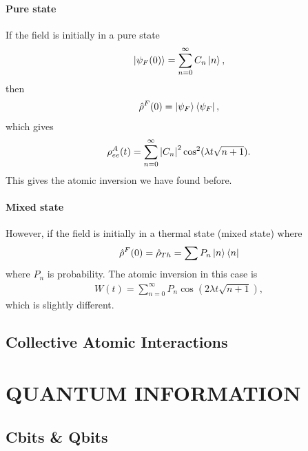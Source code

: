 \documentclass{book}
\theoremstyle{definition}
\begin{document}
\subsubsection{Pure state}
If the field is initially in a pure state
\begin{align}
\ket{\psi_F(0)} = \sum^\infty_{n=0}C_n\ket{n},
\end{align}
then
\begin{align}
\hat{\rho}^F(0) = \ket{\psi_F}\bra{\psi_F},
\end{align}
which gives
\begin{align}
\rho^A_{ee}(t) = \sum^\infty_{n=0}\abs{C_n}^2\cos^2(\lambda t \sqrt{n+1}).
\end{align}
This gives the atomic inversion we have found before. 
\subsubsection{Mixed state}
However, if the field is initially in a thermal state (mixed state) where
\begin{align}
\hat{\rho}^F(0) = \hat{\rho}_{Th} = \sum P_n\ket{n}\bra{n}
\end{align}
where $P_n$ is probability. The atomic inversion in this case is
\begin{align}
W(t) = \sum^\infty_{n=0}P_n \cos(2\lambda t\sqrt{n+1}),
\end{align}
which is slightly different. 



















\newpage

\section{Collective Atomic Interactions}



\newpage


\chapter{QUANTUM INFORMATION}

\newpage



\section{Cbits \& Qbits}
\end{document}
